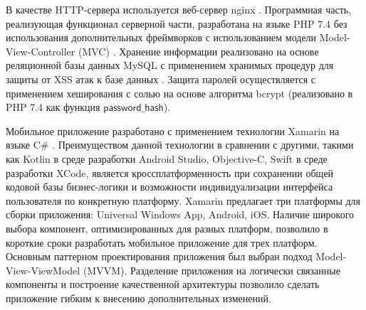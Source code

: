 
В качестве HTTP-сервера используется веб-сервер nginx \cite{reese_nginx_2008}. Программная часть, реализующая функционал серверной части, 
разработана на языке PHP 7.4 \cite{Nixon_web_2016} без использования дополнительных фреймворков с использованием модели Model-View-Controller (MVC) \cite{pitt_pro_2021}. 
Хранение информации реализовано на основе реляционной базы данных MySQL с применением хранимых процедур для защиты от XSS атак к базе данных \cite{stuttard_web_2011}.
Защита паролей осуществляется с применением хеширования с солью на основе алгоритма bcrypt (реализовано в PHP 7.4 как функция $\mathsf{password\_hash}$).


Мобильное приложение разработано с применением технологии Xamarin на языке C$\mathsf{\#}$ \cite{sole_xamarin_2022}. Преимуществом данной технологии в сравнении с 
другими, такими как Kotlin в среде разработки Android Studio, Objective-C, Swift в среде разработки XCode, является кроссплатформенность
при сохранении общей кодовой базы бизнес-логики и возможности индивидуализации интерфейса пользователя по конкретную платформу.
Xamarin предлагает три платформы для сборки приложения: Universal Windows App, Android, iOS. Наличие широкого выбора компонент,
оптимизированных для разных платформ, позволило в короткие сроки разработать мобильное приложение для трех платформ.
Основным паттерном проектирования приложения был выбран подход Model-View-ViewModel (MVVM). Разделение приложения на логически
связанные компоненты и построение качественной архитектуры позволило сделать приложение гибким к внесению дополнительных изменений.





